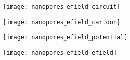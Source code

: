 %
\begin{figure*}[b]
  \centering

  \begin{subfigure}[t]{15mm}
    \centering
    \caption{}\vspace{-2.5mm}\label{fig:nanopores_efield_circuit}
    \texttt{[image: nanopores\_efield\_circuit]}
  \end{subfigure}
  \hspace{-3mm}
  \begin{subfigure}[t]{25mm}
    \centering
    \caption{}\vspace{-2.5mm}\label{fig:nanopores_efield_cartoon}
    \texttt{[image: nanopores\_efield\_cartoon]}
  \end{subfigure}
  \hspace{-2.5mm}
  \begin{subfigure}[t]{35mm}
    \centering
    \caption{}\vspace{-2.5mm}\label{fig:nanopores_efield_potential}
    \texttt{[image: nanopores\_efield\_potential]}
  \end{subfigure}
  \hspace{-0.5mm}
  \begin{subfigure}[t]{35mm}
    \centering
    \caption{}\vspace{-2.5mm}\label{fig:nanopores_efield_efield}
    \texttt{[image: nanopores\_efield\_efield]}
  \end{subfigure}


\end{figure*}

